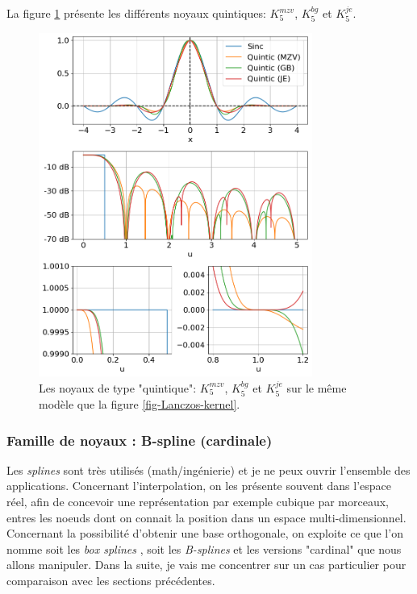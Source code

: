 \documentclass[11pt,twoside]{article}
\begin{document}
La figure \ref{fig-quintic-kernels} présente les différents noyaux quintiques: $K^{mzv}_5$, $K^{bg}_5$ et $K^{je}_5$. 
\begin{figure}
\centering
\includegraphics[width=0.8\textwidth]{fig10.png}
\caption{Les noyaux de type "quintique": $K^{mzv}_5$, $K^{bg}_5$ et $K^{je}_5$  sur le même modèle que la figure \ref{fig-Lanczos-kernel}.}
\label{fig-quintic-kernels}
\end{figure}

%
\subsubsection{Famille de noyaux : B-spline (cardinale)}
%
Les \textit{splines} sont très utilisés (math/ingénierie) et je ne peux ouvrir l'ensemble des applications. Concernant l'interpolation, on les présente souvent dans l'espace réel, afin de concevoir une représentation par exemple cubique par morceaux, entres les noeuds dont on connait la position dans un espace multi-dimensionnel. Concernant la possibilité d'obtenir une base orthogonale, on exploite ce que l'on nomme soit les \textit{box splines} \cite{10.5555/1525499}, soit les \textit{B-splines} et les versions "cardinal" \cite{Unser1993a} que nous allons manipuler.  Dans la suite, je vais me concentrer sur un cas particulier pour comparaison avec les sections précédentes. 
\end{document}
